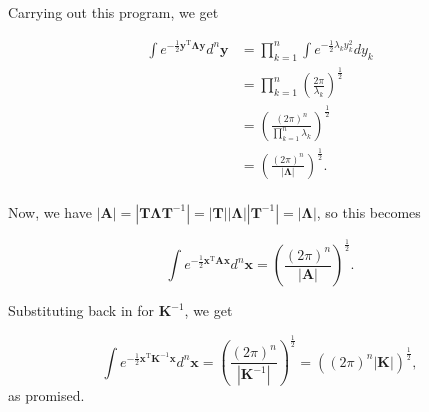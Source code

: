 \documentclass[12pt]{article}
\newcommand{\mv}[1]{\mathbf{#1}}	%
\newcommand{\mvt}[1]{\mv{#1}^{\mathrm{T}}}
\newcommand{\mvi}[1]{\mv{#1}^{-1}}
\begin{document}
Carrying out this program, we get

\begin{align}
\int e^{-\frac{1}{2} \mvt{y} \mv{\Lambda}\mv{y}} d^n \mv{y}
&= \prod_{k=1}^{n} \int e^{-\frac{1}{2} \lambda_k y_k^2} d y_k\\
&= \prod_{k=1}^{n} \left(\frac{2 \pi}{\lambda_k}\right)^{\frac{1}{2}} \\
&= \left(\frac{(2 \pi)^n}{\prod_{k=1}^{n}\lambda_k}\right)^{\frac{1}{2}} \\
&= \left(\frac{(2 \pi)^n}{|\mv{\Lambda}|}\right)^{\frac{1}{2}}. \\
\end{align}

Now, we have $|\mv{A}| = |\mv{T} \mv{\Lambda} \mvi{T}| = |\mv{T}| |\mv{\Lambda}| |\mvi{T}|  = |\mv{\Lambda}|$, so this becomes

\begin{equation}
\int e^{-\frac{1}{2} \mvt{x} \mv{A} \mv{x}} d^n \mv{x} = \left(\frac{(2 \pi)^n}{|\mv{A}|}\right)^{\frac{1}{2}}.
\end{equation}

Substituting back in for $\mvi{K}$, we get

\begin{equation}
\int e^{-\frac{1}{2} \mvt{x} \mvi{K} \mv{x}} d^n \mv{x} = \left(\frac{(2 \pi)^n}{|\mvi{K}|}\right)^{\frac{1}{2}} = \left((2 \pi)^n |\mv{K}|\right)^{\frac{1}{2}},
\end{equation}
as promised.
\end{document}
